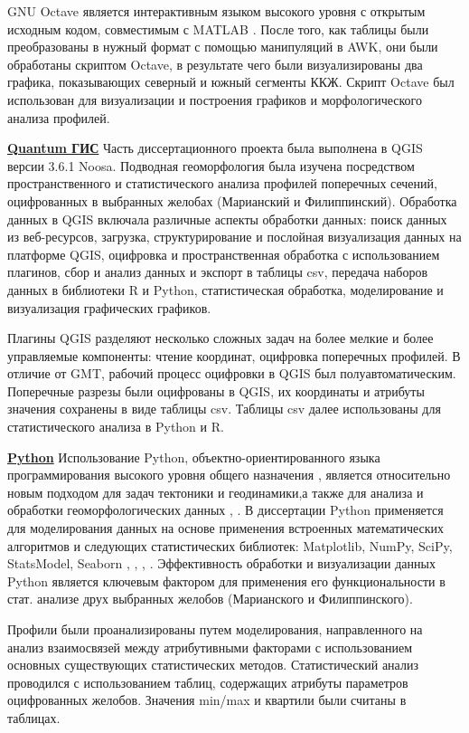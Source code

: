 GNU Octave является интерактивным языком высокого уровня с открытым исходным кодом, совместимым с MATLAB \cite{Eatonetal2019}. После того, как таблицы были преобразованы в нужный формат с помощью манипуляций в AWK, они были обработаны скриптом Octave, в результате чего были визуализированы два графика, показывающих северный и южный сегменты ККЖ. Скрипт Octave был использован для визуализации и построения графиков и морфологического анализа профилей.

\underline{\textbf{Quantum ГИС}} 
Часть диссертационного проекта была выполнена в QGIS версии 3.6.1 Noosa. Подводная геоморфология была изучена посредством пространственного и статистического анализа профилей поперечных сечений, оцифрованных в выбранных желобах (Марианский и Филиппинский). Обработка данных в QGIS включала различные аспекты обработки данных: поиск данных из веб-ресурсов, загрузка, структурирование и послойная визуализация данных на платформе QGIS, оцифровка и пространственная обработка с использованием плагинов, сбор и анализ данных и экспорт в таблицы csv, передача наборов данных в библиотеки R и Python, статистическая обработка, моделирование и визуализация графических графиков. 

Плагины QGIS разделяют несколько сложных задач на более мелкие и более управляемые компоненты: чтение координат, оцифровка поперечных профилей. В отличие от GMT, рабочий процесс оцифровки в QGIS был полуавтоматическим. Поперечные разрезы были оцифрованы в QGIS, их координаты и атрибуты значения сохранены в виде таблицы csv.  Таблицы csv далее использованы для статистического анализа в Python и R. 

\underline{\textbf{Python}} 
Использование Python, объектно-ориентированного языка программирования высокого уровня общего назначения \cite{Rossumatal2018},  является относительно новым подходом для задач тектоники и геодинамики,а также для анализа и обработки геоморфологических данных \cite{Oliphant2007}, \cite{PerezGranger2007}. В диссертации Python применяется для моделирования данных на основе применения встроенных математических алгоритмов и следующих статистических библиотек: Matplotlib, NumPy, SciPy, StatsModel, Seaborn \cite{Jonesetal2014}, \cite{Kuhlman2013}, \cite{MillmanAivazis2011}, \cite{Pedregosaetal2011}. Эффективность обработки и визуализации данных Python является ключевым фактором для применения его функциональности в стат. анализе друх выбранных желобов (Марианского и Филиппинского). 
	
Профили были проанализированы путем моделирования, направленного на анализ взаимосвязей между атрибутивными факторами с использованием основных существующих статистических методов. Статистический анализ проводился с использованием таблиц, содержащих атрибуты параметров оцифрованных желобов. Значения min/max и квартили были считаны в таблицах. 
	
